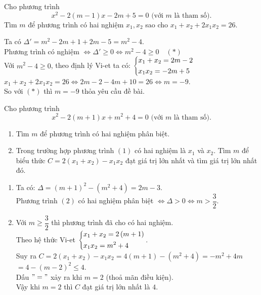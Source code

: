    \begin{bt}%
   	Cho phương trình 
   \[x^2-2(m-1)x-2m+5=0 \,\, \text{(với $m$ là tham số)}.\tag{1}\]
   	Tìm $m$ để phương trình có hai nghiệm $x_1,x_2$ sao cho $x_1+x_2+2x_1x_2=26$.
   	\loigiai
   	{Ta có $\Delta '=m^2-2m+1+2m-5=m^2-4$.\\
   		Phương trình có nghiệm  $\Leftrightarrow \Delta '\ge 0 \Leftrightarrow m^2-4\ge 0 \quad (*)$\\
   		Với $m^2-4\ge 0$, theo định lý Vi-et ta có: $\left\{\begin{aligned}&x_1+x_2=2m-2 \\ &x_1x_2=-2m+5 \end{aligned}\right.$\\
   		$x_1+x_2+2x_1x_2=26\Leftrightarrow 2m-2-4m+10=26\Leftrightarrow m=-9$.\\
   		So với $(*)$ thì $m=-9$ thỏa yêu cầu đề bài.
   		
   	}
   \end{bt}
   \begin{bt}%
   	Cho phương trình 
   	\[x^2-2( m+1)x+m^2+4=0\,\, \text{(với $m$ là tham số)}.\tag{1}\]
   	\begin{enumerate}
   		\item Tìm $m$ để phương trình có hai nghiệm phân biệt.
   		\item Trong trường hợp phương trình $(1)$ có hai nghiệm là  $x_1$ và $x_2$. Tìm $m$ để biểu thức $C=2(x_1+x_2)-x_1x_2$ đạt giá trị lớn nhất và tìm giá trị lớn nhất đó.
   	\end{enumerate}
   	\loigiai
   	{
   		\begin{enumerate}
   			\item Ta có: $\Delta =( m+1)^2-(m^2+4)=2m-3$.\\
   			Phương trình $(2)$ có hai nghiệm phân biệt 
   			$\Leftrightarrow \Delta>0\Leftrightarrow m>\dfrac{3}{2}$.
   			\item Với $m\ge \dfrac{3}{2}$ thì phương trình đã cho có hai nghiệm.\\
   			Theo hệ thức Vi-et $\left\{\begin{aligned}
   				& {{x}_{1}}+{{x}_{2}}=2\left( m+1 \right) \\
   				& {{x}_{1}}{{x}_{2}}={{m}^{2}}+4\end{aligned}\right.$.\\
   			Suy ra  $C=2({{x}_{1}}+{{x}_{2}})-{{x}_{1}}{{x}_{2}}=4\left( m+1 \right)-\left( {{m}^{2}}+4 \right)=-{{m}^{2}}+4m$
   			$=4-{{\left( m-2 \right)}^{2}}\le 4$.\\
   			Dấu $"="$ xảy ra khi  $m = 2$ (thoả mãn điều kiện).\\
   			Vậy khi $m = 2$ thì $C$ đạt giá trị lớn nhất là $4$.
   		\end{enumerate}
   	}
   \end{bt}
